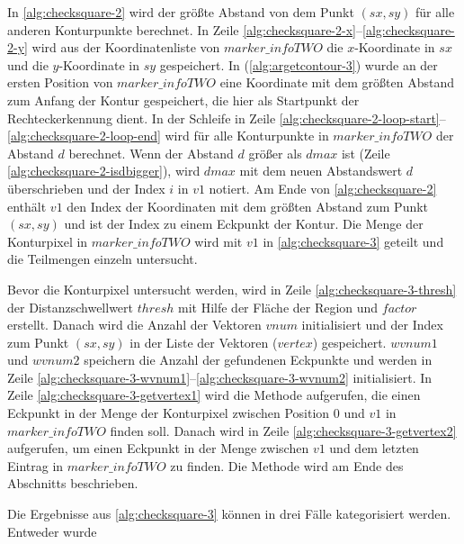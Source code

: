 In \autoref{alg:checksquare-2} wird der größte Abstand von dem Punkt $(\mathit{sx},\mathit{sy})$ für alle anderen
 Konturpunkte berechnet. In Zeile \ref{alg:checksquare-2-x}--\ref{alg:checksquare-2-y} wird aus der Koordinatenliste
 von $\mathit{marker\_infoTWO}$ die $x$-Koordinate in $\mathit{sx}$ und die $y$-Koordinate in $\mathit{sy}$
 gespeichert. In  (\autoref{alg:argetcontour-3}) wurde an der ersten Position von
 $\mathit{marker\_infoTWO}$ eine Koordinate mit dem größten Abstand zum Anfang der Kontur gespeichert, die hier als
 Startpunkt der Rechteckerkennung dient. In der Schleife in Zeile
 \ref{alg:checksquare-2-loop-start}--\ref{alg:checksquare-2-loop-end} wird für alle Konturpunkte in
 $\mathit{marker\_infoTWO}$ der Abstand $d$ berechnet. Wenn der Abstand $d$ größer als $\mathit{dmax}$ ist (Zeile
 \ref{alg:checksquare-2-isdbigger}), wird $\mathit{dmax}$ mit dem neuen Abstandswert $d$ überschrieben und der Index
 $i$ in $\mathit{v1}$ notiert. Am Ende von \autoref{alg:checksquare-2} enthält $\mathit{v1}$ den Index der Koordinaten
 mit dem größten Abstand zum Punkt $(\mathit{sx},\mathit{sy})$ und ist der Index zu einem Eckpunkt der Kontur. Die
 Menge der Konturpixel in $\mathit{marker\_infoTWO}$ wird mit $\mathit{v1}$ in \autoref{alg:checksquare-3} geteilt und
 die Teilmengen einzeln untersucht.



Bevor die Konturpixel untersucht werden, wird in Zeile \ref{alg:checksquare-3-thresh} der Distanzschwellwert
 $\mathit{thresh}$ mit Hilfe der Fläche der Region und $\mathit{factor}$ erstellt. Danach wird die Anzahl der Vektoren
 $\mathit{vnum}$ initialisiert und der Index zum Punkt $(\mathit{sx}, \mathit{sy})$ in der Liste der Vektoren
 ($\mathit{vertex}$) gespeichert. $wvnum1$ und $wvnum2$ speichern die Anzahl der gefundenen Eckpunkte und werden in
 Zeile \ref{alg:checksquare-3-wvnum1}--\ref{alg:checksquare-3-wvnum2} initialisiert. In Zeile
 \ref{alg:checksquare-3-getvertex1} wird die Methode  aufgerufen, die einen Eckpunkt in der Menge
 der Konturpixel zwischen Position $0$ und $\mathit{v1}$ in $\mathit{marker\_infoTWO}$ finden soll. Danach wird
  in Zeile \ref{alg:checksquare-3-getvertex2} aufgerufen, um einen Eckpunkt in der Menge zwischen
 $\mathit{v1}$ und dem letzten Eintrag in $\mathit{marker\_infoTWO}$ zu finden. Die Methode  wird
 am Ende des Abschnitts beschrieben.

Die Ergebnisse aus \autoref{alg:checksquare-3} können in drei Fälle kategorisiert werden. Entweder wurde

